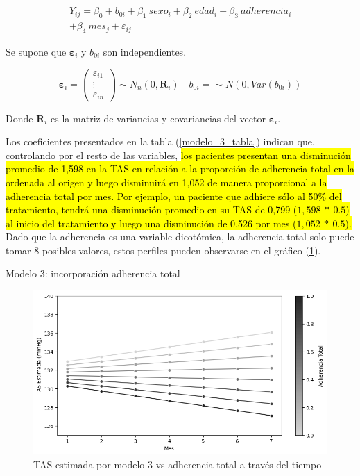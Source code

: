 \documentclass[spanish]{article}
\numberwithin{figure}{subsection}
\numberwithin{equation}{subsection}
\numberwithin{table}{subsection}
\begin{document}
\begin{multline}
	\label{modelo_3}
	Y_{ij} = \beta_0 + b_{0i} + \beta_1\ sexo_i + \beta_2\ edad_i + \beta_3\ \overline{adherencia}_i \\
	+ \beta_4\ mes_j + \varepsilon_{ij}
\end{multline}

Se supone que $\bm{\varepsilon}_i$ y $b_{0i}$ son independientes.

\[ 
	\bm{\varepsilon}_i = \begin{pmatrix} \varepsilon_{i1} \\ \vdots \\ \varepsilon_{in} \end{pmatrix} \sim N_{n}(0, \bm{R}_i)
	\quad
	b_{0i} = \sim N(0, Var(b_{0i}))
\]

Donde $\bm{R}_i$ es la matriz de variancias y covariancias del vector
$\bm{\varepsilon}_i$.

Los coeficientes presentados en la tabla (\ref{modelo_3_tabla}) indican que,
controlando por el resto de las variables, \hl{los pacientes presentan una
disminución promedio de 1,598 en la TAS en relación a la proporción de
adherencia total en la ordenada al origen y luego disminuirá en 1,052 de manera
proporcional a la adherencia total por mes. Por ejemplo, un paciente que adhiere
sólo al 50\% del tratamiento, tendrá una disminución promedio en su TAS de 0,799
($1,598\ *\ 0.5$) al inicio del tratamiento y luego una disminución de 0,526 por
mes ($1,052\ *\ 0.5$).} Dado que la adherencia es una variable dicotómica, la
adherencia total solo puede tomar 8 posibles valores, estos perfiles pueden
observarse en el gráfico (\ref{modelo_3_plot}).

\begin{table}[H]
	\centering
	\caption{Modelo 3: incorporación adherencia total}
	\label{modelo_3_tabla}
	
\end{table}

\begin{figure}[H]
	\centering
	\includegraphics[scale=0.5]{img/modelo_3.png}
	\caption{TAS estimada por modelo 3 vs adherencia total a través del tiempo}
	\label{modelo_3_plot}
\end{figure}
\end{document}

